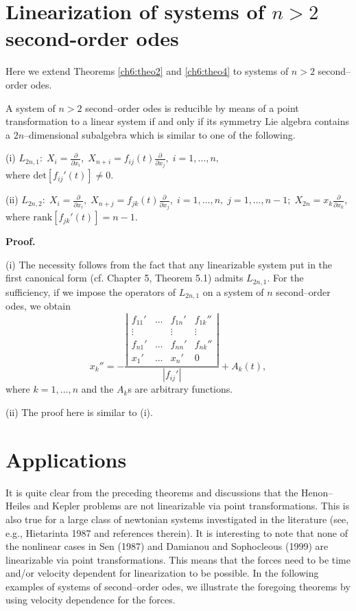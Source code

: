 \section{Linearization of systems of $n>2$ second-order odes}
Here we extend Theorems \ref{ch6:theo2} and \ref{ch6:theo4} to systems of
$n > 2$ second--order odes.
\begin{theo}
\label{ch6:theo6}
\begin{em}
A system of $n> 2$ second--order odes is reducible by means of a point 
transformation to a linear system if and only if its symmetry Lie algebra
contains a $2n$--dimensional subalgebra which is similar to one of the
following. 

(i) $L_{2n,1}:\;\displaystyle{X_i=\frac{\partial}{\partial x_i},\;
X_{n+i}=f_{ij}(t)\frac{\partial}{\partial x_j}},\;i=1,\ldots ,n,$ \\
where $\mbox{det}[f_{ij}'(t)]\ne 0.$ 

(ii) $L_{2n,2}:\;\displaystyle{X_i=\frac{\partial}{\partial x_i},\;
X_{n+j}=f_{jk}(t)\frac{\partial}{\partial x_j},\;i=1,\ldots ,n,\;
j=1,\ldots,n-1;\; X_{2n}=x_k\frac{\partial}{\partial x_k}},$ \\
where $\mbox{rank}[f_{jk}'(t)]=n-1.$ 
\end{em}
\end{theo}
{\bf Proof.}

(i) The necessity follows from the fact  that any linearizable system 
put in the
first canonical form (cf. Chapter 5, Theorem 5.1) admits $L_{2n,1}$. For the sufficiency, if we
impose the operators of $L_{2n,1}$ on a system of $n$ second--order odes, we
obtain
\[ x_{k}''=-\frac{ \left |
\begin{array}{llll}
f_{11}' & \ldots & f_{1n}' & f_{1k}''\\
\vdots &         & \vdots  & \vdots \\    
f_{n1}' & \ldots  & f_{nn}' & f_{nk}''\\
x_1'   & \ldots  & x_n'    &  0  
\end{array} \right |}{|f_{ij}'|} +A_k(t),\]
where $k=1,\dots ,n$ and the $A_k$s are arbitrary functions.

(ii) The proof here is similar to (i).

\section{Applications}
It is quite clear from the preceding theorems and discussions that the
Henon--Heiles and Kepler problems are not linearizable via point
transformations. This is also true for a large class of newtonian systems
investigated in the literature (see, e.g., Hietarinta 1987 and references
therein).
It is interesting to note that none of the nonlinear cases in Sen (1987) and
Damianou and Sophocleous (1999) are linearizable via point transformations.
This means that the forces need to be time and/or velocity dependent for
linearization to be possible. In the following examples of systems of
second--order odes, we illustrate the foregoing theorems by using velocity
dependence for the forces.


